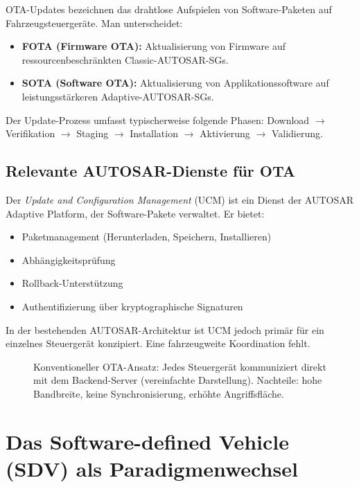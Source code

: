﻿\documentclass[12pt,a4paper,twoside]{article}
\begin{document}
OTA-Updates bezeichnen das drahtlose Aufspielen von Software-Paketen auf
Fahrzeugsteuergeräte. Man unterscheidet:

\begin{itemize}
  \item \textbf{FOTA (Firmware OTA):} Aktualisierung von Firmware auf
    ressourcenbeschränkten Classic-AUTOSAR-SGs.
  \item \textbf{SOTA (Software OTA):} Aktualisierung von Applikationssoftware
    auf leistungsstärkeren Adaptive-AUTOSAR-SGs.
\end{itemize}

Der Update-Prozess umfasst typischerweise folgende Phasen:
Download $\rightarrow$ Verifikation $\rightarrow$ Staging $\rightarrow$
Installation $\rightarrow$ Aktivierung $\rightarrow$ Validierung.

\subsection{Relevante AUTOSAR-Dienste für OTA}

Der \textit{Update and Configuration Management} (UCM) ist ein Dienst der
AUTOSAR Adaptive Platform, der Software-Pakete verwaltet. Er bietet:
\begin{itemize}
  \item Paketmanagement (Herunterladen, Speichern, Installieren)
  \item Abhängigkeitsprüfung
  \item Rollback-Unterstützung
  \item Authentifizierung über kryptographische Signaturen
\end{itemize}

In der bestehenden AUTOSAR-Architektur ist UCM jedoch primär für ein
einzelnes Steuergerät konzipiert. Eine fahrzeugweite Koordination fehlt.

\begin{figure}[h!]
  \centering
  
  \caption{Konventioneller OTA-Ansatz: Jedes Steuergerät kommuniziert
    direkt mit dem Backend-Server (vereinfachte Darstellung).
    Nachteile: hohe Bandbreite, keine Synchronisierung, erhöhte Angriffsfläche.}
  \label{fig:ota_current}
\end{figure}




\section{Das Software-defined Vehicle (SDV) als Paradigmenwechsel}
\label{sec:sdv}
\end{document}
